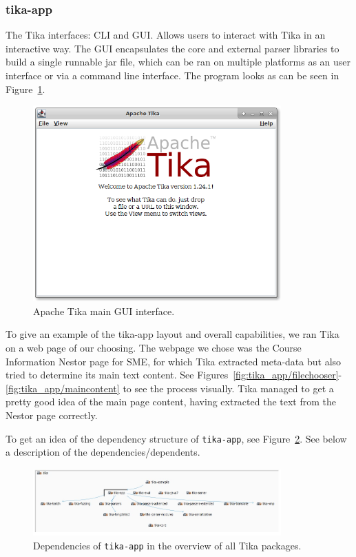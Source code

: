\documentclass{article}
\begin{document}
\subsubsection{tika-app}
The Tika interfaces: CLI and GUI. Allows users to interact with Tika in an interactive way. The GUI encapsulates the core and external parser libraries to build a single runnable jar file, which can be ran on multiple platforms as an user interface or via a command line interface. The program looks as can be seen in Figure~\ref{fig:tika_app/main}.

\begin{figure}[ht]
    \centering
    \includegraphics[width=0.85\textwidth]{report/images/tika_app/main.png}
    \caption{Apache Tika main GUI interface.}
    \label{fig:tika_app/main}
\end{figure}

To give an example of the tika-app layout and overall capabilities, we ran Tika on a web page of our choosing. The webpage we chose was the Course Information Nestor page for SME, for which Tika extracted meta-data but also tried to determine its main text content. See Figures~\ref{fig:tika_app/filechooser}-\ref{fig:tika_app/maincontent} to see the process visually. Tika managed to get a pretty good idea of the main page content, having extracted the text from the Nestor page correctly.

To get an idea of the dependency structure of \texttt{tika-app}, see Figure~\ref{fig:tika_app/s101-overview}. See below a description of the dependencies/dependents.
\begin{figure}[ht]
    \centering
    \includegraphics[width=0.85\textwidth]{report/images/tika_app/s101-overview.jpeg}
    \caption{Dependencies of \texttt{tika-app} in the overview of all Tika packages.}
    \label{fig:tika_app/s101-overview}
\end{figure}
\end{document}
